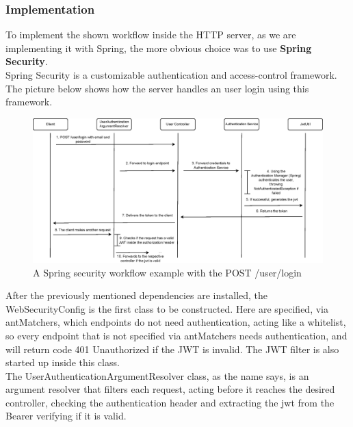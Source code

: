 \subsubsection{Implementation}

To implement the shown workflow inside the HTTP server, as we are implementing it with Spring, the more obvious choice was to use \textbf{Spring Security}\cite{springsecurity}.\\

Spring Security is a customizable authentication and access-control framework.\\

The picture below shows how the server handles an user login using this framework.\\

\newpage
\begin{figure}[H]
    \begin{center}
        \includegraphics[scale=0.60]{_figures/Spring-jwt-diagram.eps}
        \caption{A Spring security workflow example with the POST /user/login}
    \end{center}
\end{figure}

After the previously mentioned dependencies are installed, the WebSecurityConfig is the first class to be constructed. Here are specified, via antMatchers, which
endpoints do not need authentication, acting like a whitelist, so every endpoint that is not specified via antMatchers needs authentication, and will return code 401
Unauthorized if the JWT is invalid. The JWT filter is also started up inside this class.\\

The UserAuthenticationArgumentResolver class, as the name says, is an argument resolver that filters each request, acting before it reaches the desired controller,
checking the authentication header and extracting the jwt from the Bearer verifying if it is valid.\\

